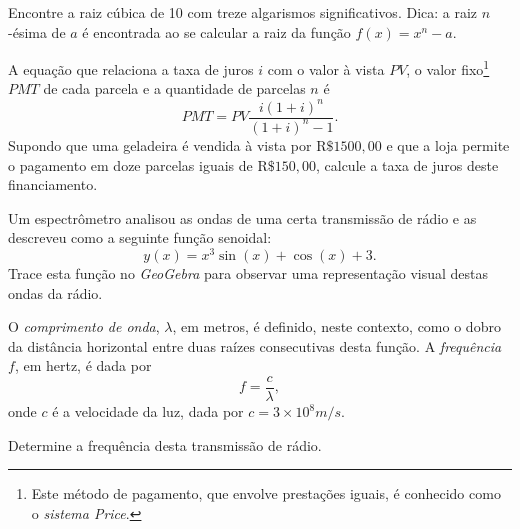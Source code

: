\begin{ex}
Encontre a raiz cúbica de 10 com treze algarismos significativos. Dica: a raiz $n$-ésima de $a$ é encontrada ao se calcular a raiz da função $f(x)=x^n-a$.
\end{ex}


\begin{ex}
A equação que relaciona a taxa de juros $i$ com o valor à vista $PV$, o valor fixo\footnote{Este método de pagamento, que envolve prestações iguais, é conhecido como o \emph{sistema Price}.} $PMT$ de cada parcela e a quantidade de parcelas $n$ é
$$PMT=PV\frac{i(1+i)^n}{(1+i)^n-1}.$$
Supondo que uma geladeira é vendida à vista por R$\$1500,00$ e que a loja permite o pagamento em doze parcelas iguais de R$\$150,00$, calcule a taxa de juros deste financiamento. 
\end{ex}

\begin{ex}
Um espectrômetro analisou as ondas de uma certa transmissão de rádio e as descreveu como a seguinte função senoidal:
$$y(x)=x^3\sin(x)+\cos(x)+3.$$
Trace esta função no \emph{GeoGebra} para observar uma representação visual destas ondas da rádio. 


O \emph{comprimento de onda}, $\lambda$, em metros, é definido, neste contexto, como o dobro da distância horizontal entre duas raízes consecutivas desta função. A \emph{frequência} $f$, em hertz, é dada por
$$f=\frac{c}{\lambda},$$
onde $c$ é a velocidade da luz, dada por $c=3\times 10^8 m/s$.


Determine a frequência desta transmissão de rádio.
\end{ex}
%
%
%